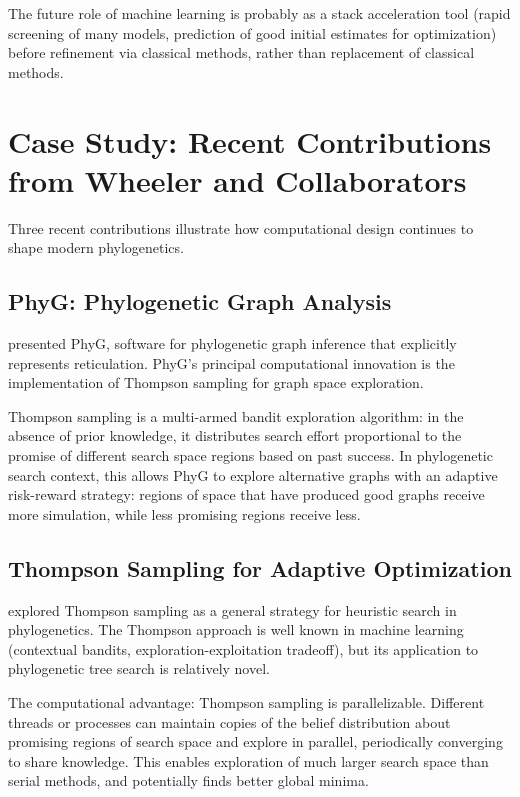 The future role of machine learning is probably as a stack acceleration tool (rapid screening of many models, prediction of good initial estimates for optimization) before refinement via classical methods, rather than replacement of classical methods.

\section{Case Study: Recent Contributions from Wheeler and Collaborators}

Three recent contributions illustrate how computational design continues to shape modern phylogenetics.

\subsection{PhyG: Phylogenetic Graph Analysis}

\textcite{wheeler2024a} presented PhyG, software for phylogenetic graph inference that explicitly represents reticulation. PhyG's principal computational innovation is the implementation of Thompson sampling for graph space exploration.

Thompson sampling is a multi-armed bandit exploration algorithm: in the absence of prior knowledge, it distributes search effort proportional to the promise of different search space regions based on past success. In phylogenetic search context, this allows PhyG to explore alternative graphs with an adaptive risk-reward strategy: regions of space that have produced good graphs receive more simulation, while less promising regions receive less.

\subsection{Thompson Sampling for Adaptive Optimization}

\textcite{wheeler2024} explored Thompson sampling as a general strategy for heuristic search in phylogenetics. The Thompson approach is well known in machine learning (contextual bandits, exploration-exploitation tradeoff), but its application to phylogenetic tree search is relatively novel.

The computational advantage: Thompson sampling is parallelizable. Different threads or processes can maintain copies of the belief distribution about promising regions of search space and explore in parallel, periodically converging to share knowledge. This enables exploration of much larger search space than serial methods, and potentially finds better global minima.

